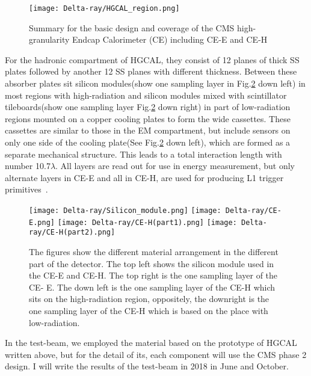 \documentclass[12pt,twoside,a4paper,an,final]{cms-tdr}
\begin{document}
\begin{figure}[!htb]
\centering 
     \texttt{[image: Delta-ray/HGCAL\_region.png]}
\caption{Summary for the basic design and coverage of the CMS high-granularity Endcap Calorimeter (CE) including CE-E and CE-H}
\label{HGCAL_region}
\end{figure}

For the hadronic compartment of HGCAL, they consist of 12 planes of thick SS plates followed by another 12 SS planes with different thickness. Between these absorber plates sit silicon modules(show one sampling layer in Fig.\ref{HGCAL_Material} down left) in most regions with high-radiation and silicon modules mixed with scintillator tileboards(show one sampling layer Fig.\ref{HGCAL_Material} down right) in part of low-radiation regions mounted on a copper cooling plates to form the wide cassettes.  These cassettes are similar to those in the EM compartment, but include sensors on only one side of the cooling plate(See Fig.\ref{HGCAL_Material} down left), which are formed as a separate mechanical structure. This leads to a total interaction length with number 10.7$\lambda$. All layers are read out for use in energy measurement, but only alternate layers in CE-E and all in CE-H, are used for producing L1 trigger primitives~\cite{Collaboration:2283192}. 

\begin{figure}[!htb]
\centering  
     \texttt{[image: Delta-ray/Silicon\_module.png]}
     \texttt{[image: Delta-ray/CE-E.png]}
     \texttt{[image: Delta-ray/CE-H(part1).png]}
     \texttt{[image: Delta-ray/CE-H(part2).png]}
\caption{The figures show the different material arrangement in the different part of the detector. The top left shows the silicon module used in the CE-E and CE-H. The top right is the one sampling layer of the CE- E. The down left is the one sampling layer of the CE-H which sits on the high-radiation region, oppositely, the downright is the one sampling layer of the CE-H which is based on the place with low-radiation.}
\label{HGCAL_Material}
\end{figure}

In the test-beam, we employed the material based on the prototype of HGCAL written above,  but for the detail of its, each component will use the CMS phase 2 design. I will write the results of the test-beam in 2018 in June and October.  
\end{document}

